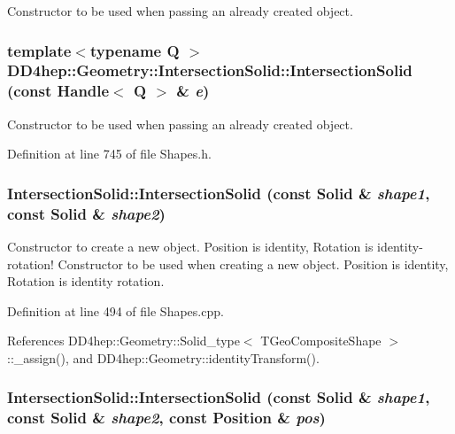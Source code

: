 Constructor to be used when passing an already created object. \hypertarget{class_d_d4hep_1_1_geometry_1_1_intersection_solid_aea0aa8d4337c57f929b59aa876851e63}{
\subsubsection[{IntersectionSolid}]{\setlength{\rightskip}{0pt plus 5cm}template$<$typename Q $>$ DD4hep::Geometry::IntersectionSolid::IntersectionSolid (const {\bf Handle}$<$ Q $>$ \& {\em e})}}
\label{class_d_d4hep_1_1_geometry_1_1_intersection_solid_aea0aa8d4337c57f929b59aa876851e63}


Constructor to be used when passing an already created object. 

Definition at line 745 of file Shapes.h.\hypertarget{class_d_d4hep_1_1_geometry_1_1_intersection_solid_a87844b8aab46a41e8b1a94e06c7ea88b}{
\subsubsection[{IntersectionSolid}]{\setlength{\rightskip}{0pt plus 5cm}IntersectionSolid::IntersectionSolid (const {\bf Solid} \& {\em shape1}, \/  const {\bf Solid} \& {\em shape2})}}
\label{class_d_d4hep_1_1_geometry_1_1_intersection_solid_a87844b8aab46a41e8b1a94e06c7ea88b}


Constructor to create a new object. Position is identity, Rotation is identity-\/rotation! Constructor to be used when creating a new object. Position is identity, Rotation is identity rotation. 

Definition at line 494 of file Shapes.cpp.

References DD4hep::Geometry::Solid\_\-type$<$ TGeoCompositeShape $>$::\_\-assign(), and DD4hep::Geometry::identityTransform().\hypertarget{class_d_d4hep_1_1_geometry_1_1_intersection_solid_a4b62f2ea208c14e2d2ea4006bce4cc67}{
\subsubsection[{IntersectionSolid}]{\setlength{\rightskip}{0pt plus 5cm}IntersectionSolid::IntersectionSolid (const {\bf Solid} \& {\em shape1}, \/  const {\bf Solid} \& {\em shape2}, \/  const {\bf Position} \& {\em pos})}}
\label{class_d_d4hep_1_1_geometry_1_1_intersection_solid_a4b62f2ea208c14e2d2ea4006bce4cc67}


